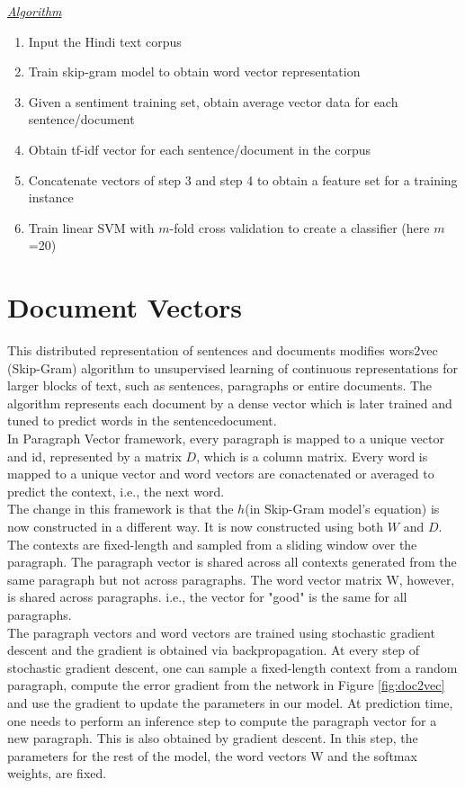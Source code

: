 \underline{\emph{Algorithm}}
\begin{enumerate}
\item Input the Hindi text corpus
\item Train skip-gram model to obtain word vector representation
\item Given a sentiment training set, obtain average vector data for each sentence/document
\item Obtain tf-idf vector for each sentence/document in the corpus
\item Concatenate vectors of step 3 and step 4 to obtain a feature set for a training instance
\item Train linear SVM with $m$-fold cross validation to create a classifier
(here $m$=20)
\end{enumerate}

\section{Document Vectors}
This distributed representation of sentences and documents modifies wors2vec (Skip-Gram) algorithm to unsupervised learning of continuous representations for larger blocks of text, such as sentences, paragraphs or entire documents. The algorithm represents each document by a dense vector which is later trained and tuned to predict words in the sentence\/document.\\
In Paragraph Vector framework, every paragraph is mapped to a unique vector and id, represented by a matrix $D$, which is a column matrix. Every word is mapped to a unique vector and word vectors are conactenated or averaged to predict the context, i.e., the next word.\\
The change in this framework is that the $h$(in Skip-Gram model's equation) is now constructed in a different way. It is now constructed using both $W$ and $D$.\\
The contexts are fixed-length and sampled from a sliding window over the paragraph. The paragraph vector is shared across all contexts generated from the same paragraph but not across paragraphs.  The word vector matrix W, however, is shared across paragraphs. i.e., the vector for "good" is the same for all paragraphs.\\

The paragraph vectors and word vectors are trained using stochastic gradient descent and the gradient is obtained via backpropagation.  At every step of stochastic gradient descent, one can sample a fixed-length context from a random paragraph, compute the error gradient from the network in Figure \ref{fig:doc2vec} and use the gradient to update the parameters in our model. At prediction time, one needs to perform an inference step to compute the paragraph vector for a new paragraph. This is also obtained by gradient descent.  In this step, the parameters for the rest of the model, the word vectors W
and the softmax weights, are fixed.

